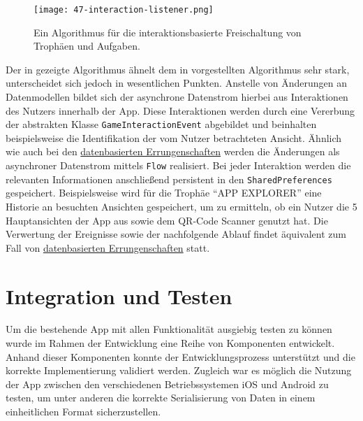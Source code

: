 \begin{figure}[H]
    \texttt{[image: 47-interaction-listener.png]}
    \caption{Ein Algorithmus für die interaktionsbasierte Freischaltung von Trophäen und
    Aufgaben.}\label{fig:interaction-listener}
\end{figure}

Der in  gezeigte Algorithmus ähnelt dem in  vorgestellten Algorithmus sehr stark, unterscheidet sich jedoch in wesentlichen Punkten. Anstelle von Änderungen an Datenmodellen bildet sich der asynchrone Datenstrom hierbei aus Interaktionen des Nutzers innerhalb der App. Diese Interaktionen werden durch eine Vererbung der abstrakten Klasse \texttt{GameInteractionEvent} abgebildet und beinhalten beispielsweise die Identifikation der vom Nutzer betrachteten Ansicht. Ähnlich wie auch bei den \hyperref[subsection:gamification-repository-listener]{datenbasierten Errungenschaften} werden die Änderungen als asynchroner Datenstrom mittels \texttt{Flow} realisiert. Bei jeder Interaktion werden die relevanten Informationen anschließend persistent in den \texttt{SharedPreferences} gespeichert. Beispielsweise wird für die Trophäe \enquote{APP EXPLORER} eine Historie an besuchten Ansichten gespeichert, um zu ermitteln, ob ein Nutzer die 5 Hauptansichten der App aus  sowie dem QR-Code Scanner genutzt hat. Die Verwertung der Ereignisse sowie der nachfolgende Ablauf findet äquivalent zum Fall von \hyperref[subsection:gamification-repository-listener]{datenbasierten Errungenschaften} statt. 


\section{Integration und Testen}

Um die bestehende App mit allen Funktionalität ausgiebig testen zu können wurde im Rahmen der Entwicklung eine Reihe von Komponenten entwickelt. Anhand dieser Komponenten konnte der Entwicklungsprozess unterstützt und die korrekte Implementierung validiert werden. Zugleich war es möglich die Nutzung der App zwischen den verschiedenen Betriebssystemen iOS und Android zu testen, um unter anderen die korrekte Serialisierung von Daten in einem einheitlichen Format sicherzustellen.

